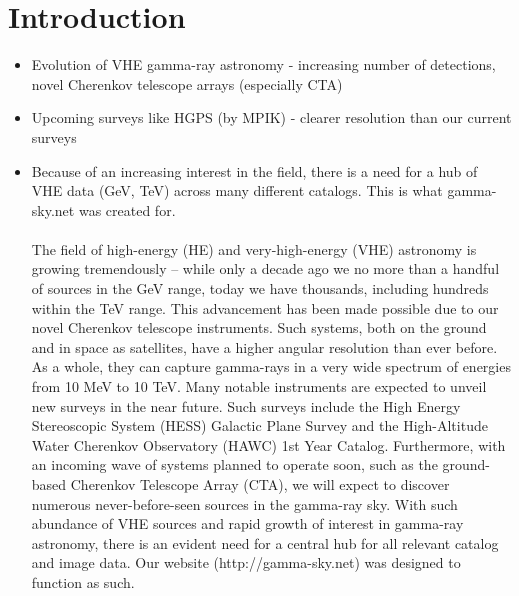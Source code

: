 \section{Introduction}

\begin{itemize}

\item Evolution of VHE gamma-ray astronomy - increasing number of detections, novel Cherenkov telescope arrays (especially CTA)

\item Upcoming surveys like HGPS (by MPIK) - clearer resolution than our current surveys

\item Because of an increasing interest in the field, there is a need for a hub of VHE data (GeV, TeV) across many different catalogs.
This is what gamma-sky.net was created for.

\pagebreak

\paragraph{}        The field of high-energy (HE) and very-high-energy (VHE) astronomy is growing tremendously – while only
        a decade ago we no more than a handful of sources in the GeV range, today we have thousands, including
        hundreds within the TeV range. This advancement has been made possible due to our novel Cherenkov telescope instruments.
        Such systems, both on the ground and in space as satellites, have a higher angular resolution than ever before.
        As a whole, they can capture gamma-rays in a very wide spectrum of energies from 10 MeV to 10 TeV.
        Many notable instruments are expected to unveil new surveys in the near future. Such surveys include the
        High Energy Stereoscopic System (HESS) Galactic Plane Survey and the High-Altitude Water Cherenkov Observatory (HAWC) 1st Year Catalog.
        Furthermore, with an incoming wave of systems planned to operate soon, such as the ground-based Cherenkov Telescope Array (CTA),
        we will expect to discover numerous never-before-seen sources in the gamma-ray sky. With such abundance of VHE sources and
        rapid growth of interest in gamma-ray astronomy, there is an evident need for a central hub for all relevant catalog and image data.
        Our website (http://gamma-sky.net) was designed to function as such. \par 

\end{itemize}
